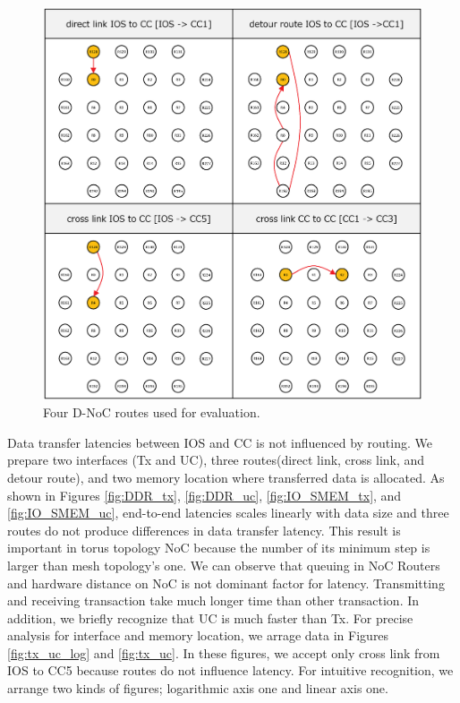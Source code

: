 \documentclass{sig-alternate-05-2015}
\begin{document}
\begin{figure}[t]
  \centering
  \includegraphics[width=1.0\linewidth]{../figure/noc_routes.eps}
  \caption{\label{fig:noc_routes}
    Four D-NoC routes used for evaluation.}
\end{figure}

Data transfer latencies between IOS and CC is not influenced by routing.
We prepare two interfaces (Tx and UC), three routes(direct link, cross link, and detour route), and two memory location where transferred data is allocated.
As shown in Figures \ref{fig:DDR_tx}, \ref{fig:DDR_uc}, \ref{fig:IO_SMEM_tx}, and \ref{fig:IO_SMEM_uc}, 
end-to-end latencies scales linearly with data size and three routes do not	produce differences in data transfer latency.
This result is important in torus topology NoC because the number of its minimum step is larger than mesh topology's one.
We can observe that queuing in NoC Routers and hardware distance on NoC is not dominant factor for latency.
Transmitting and receiving transaction take much longer time than other transaction.
In addition, we briefly recognize that UC is much faster than Tx.
For precise analysis for interface and memory location, we arrage data in Figures \ref{fig:tx_uc_log} and \ref{fig:tx_uc}.
In these figures, we accept only cross link from IOS to CC5 because routes do not influence latency.
For intuitive recognition, we arrange two kinds of figures; logarithmic axis one and linear axis one.
\end{document}
